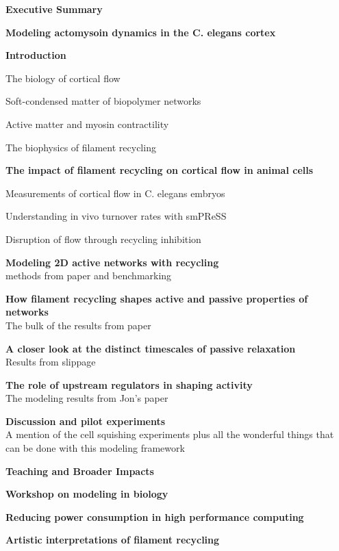 \documentclass{report}
\begin{document}
\begin{outline}
  \item {\bf Executive Summary }
  \item {\bf Modeling actomysoin dynamics in the C. elegans cortex }
  \begin{outline}
    \item {\bf Introduction }
    \begin{outline}
      \item The biology of cortical flow 
      \item Soft-condensed matter of biopolymer networks
      \item Active matter and myosin contractility 
      \item The biophysics of filament recycling
    \end{outline}
    \item {\bf The impact of filament recycling on cortical flow in animal cells} 
    \begin{outline}
      \item Measurements of cortical flow in C. elegans embryos
      \item Understanding in vivo turnover rates with smPReSS
      \item Disruption of flow through recycling inhibition
    \end{outline}
    \item {\bf Modeling 2D active networks with recycling } \\
      methods from paper and benchmarking 
    \item {\bf How filament recycling shapes active and passive properties of networks} \\
      The bulk of the results from paper
     \item {\bf A closer look at the distinct timescales of passive relaxation} \\
      Results from slippage
    \item {\bf The role of upstream regulators in shaping activity} \\
      The modeling results from Jon's paper
    \item {\bf Discussion and pilot experiments} \\
      A mention of the cell squishing experiments plus all the wonderful things that can be done with this modeling framework
  \end{outline}
  \item {\bf Teaching and Broader Impacts}
  \begin{outline}
    \item {\bf Workshop on modeling in biology } \\
    \item {\bf Reducing power consumption in high performance computing } \\
    \item {\bf Artistic interpretations of filament recycling } \\
      

\end{outline}
\end{outline}
\end{document}

